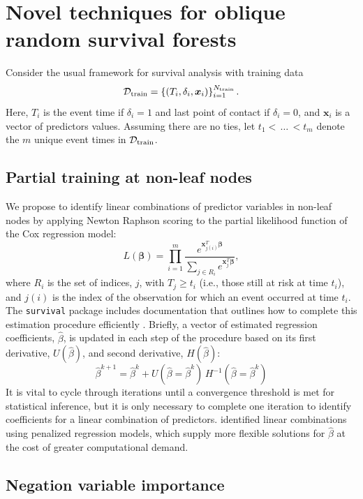 \documentclass[twoside,11pt]{article}\usepackage[]{graphicx}\usepackage[]{xcolor}
\newcommand{\dataset}{{\cal D}}
\begin{document}
\section{Novel techniques for oblique random survival forests}

Consider the usual framework for survival analysis with training data $$\dataset_{\text{train}} = \left\{ (T_i, \delta_i, \bm{x}_{i}) \right\}_{i=1}^{N_{\text{train}}}.$$ Here, $T_i$ is the event time if $\delta_i=1$ and last point of contact if $\delta_i=0$, and $\bm{x}_i$ is a vector of predictors values. Assuming there are no ties, let $t_1 < \, \ldots \, < t_m$ denote the $m$ unique event times in $\dataset_{\text{train}}$.

\subsection{Partial training at non-leaf nodes}

We propose to identify linear combinations of predictor variables in non-leaf nodes by applying Newton Raphson scoring to the partial likelihood function of the Cox regression model:
\begin{equation}\label{eqn:cox-partial-likelihood}
L(\bm\beta) = \prod_{i=1}^m \frac{e^{\bm{x}_{j(i)}^T \bm\beta}}{\sum_{j \in R_i} e^{\bm{x}_j^T \bm\beta}},
\end{equation}
where $R_i$ is the set of indices, $j$, with $T_j \geq t_i$ (i.e., those still at risk at time $t_i$), and $j(i)$ is the index of the observation for which an event occurred at time $t_i$. The \texttt{survival} package includes documentation that outlines how to complete this estimation procedure efficiently \citep[see][exact.nw]{therneau_survival_2022}. Briefly, a vector of estimated regression coefficients, $\hat{\beta}$, is updated in each step of the procedure based on its first derivative, $U(\hat{\beta})$, and second derivative, $H(\hat{\beta})$:
$$ \hat{\beta}^{k+1} =  \hat{\beta}^{k} + U(\hat{\beta} = \hat{\beta}^{k})\, H^{-1}(\hat{\beta} = \hat{\beta}^{k}) $$
It is vital to cycle through iterations until a convergence threshold is met for statistical inference, but it is only necessary to complete one iteration to identify coefficients for a linear combination of predictors. \citet{jaeger2019oblique} identified linear combinations using penalized regression models, which supply more flexible solutions for $\hat{\beta}$ at the cost of greater computational demand.

\subsection{Negation variable importance}
\end{document}
